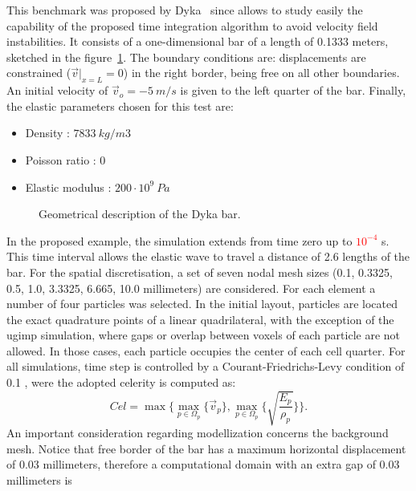 \documentclass[preprint,12pt,a4paper]{elsarticle}
\begin{document}
This benchmark was proposed by Dyka~\cite{Dyka1995} since allows to study easily the capability
of the proposed time integration algorithm to avoid velocity
field instabilities. It consists of a one-dimensional bar of a length
of 0.1333 meters, sketched in the figure~\ref{fig:Dyka_Bar}. The
boundary conditions are: displacements are constrained ($\vec{v}
\rvert_{x=L} = 0$) in the right border, being free on all other boundaries. An initial velocity of $\vec{v}_o = - 5\ m/s$ is given to the
left quarter of the bar. Finally, the elastic parameters chosen for this test are:
\begin{itemize} 
\item  Density : $7833\ kg/m3$
\item  Poisson ratio : $0$
\item  Elastic modulus : $200 \cdot 10^9\ Pa$
\end{itemize}
\begin{figure}
  \centering
  \resizebox{\hsize}{!}{
    }
  \caption{Geometrical description of the Dyka \cite{Dyka1995} bar.}
  \label{fig:Dyka_Bar}
\end{figure}
In the proposed example, the simulation extends from time zero up to \textcolor{red}{$10^{-4}$} s.
This time interval allows the elastic wave to travel a distance of 2.6
lengths of the bar. For the spatial discretisation, a set of seven nodal mesh sizes (0.1, 0.3325, 0.5, 1.0, 3.3325, 6.665, 10.0 millimeters) are considered. For each element a number of four particles was selected. In the initial layout, particles are located the exact quadrature points of a linear quadrilateral, with the exception of the \acrshort{ugimp} simulation, where gaps or overlap between
voxels of each particle are not allowed. In those cases, each particle occupies the center of each cell quarter. For all simulations, time step is controlled by a Courant-Friedrichs-Levy condition of 0.1 , were the adopted celerity is computed as:
\begin{equation}
  \label{eq:Cel}
  Cel = \max\{\max_{p \in \Omega_p}\{ \vec{v}_p \} , \max_{p \in \Omega_p}\{ \sqrt{\frac{E_p}{\rho_p}} \} \}.
\end{equation}
An important consideration regarding modellization concerns the
background mesh. Notice that free border of the bar has a maximum
horizontal displacement of 0.03 millimeters, therefore 
a computational domain with an extra gap of 0.03 millimeters is
\end{document}
